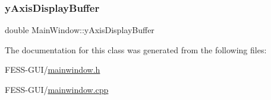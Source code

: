 \hypertarget{class_main_window_a1f9fdf363545300d34f5aee2dddb1ff5}{}\label{class_main_window_a1f9fdf363545300d34f5aee2dddb1ff5} 
\subsubsection{\texorpdfstring{y\+Axis\+Display\+Buffer}{yAxisDisplayBuffer}}
{\footnotesize\ttfamily double Main\+Window\+::y\+Axis\+Display\+Buffer}



The documentation for this class was generated from the following files\+:\begin{DoxyCompactItemize}
\item 
F\+E\+S\+S-\/\+G\+U\+I/\hyperlink{mainwindow_8h}{mainwindow.\+h}\item 
F\+E\+S\+S-\/\+G\+U\+I/\hyperlink{mainwindow_8cpp}{mainwindow.\+cpp}\end{DoxyCompactItemize}
